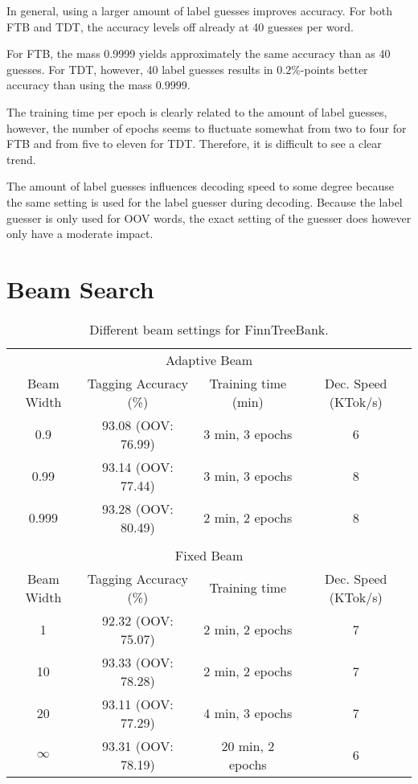 In general, using a larger amount of label guesses improves
accuracy. For both FTB and TDT, the accuracy levels off already at 40
guesses per word. 

For FTB, the mass 0.9999 yields approximately the same accuracy than
as 40 guesses. For TDT, however, 40 label guesses results in
$0.2\%$-points better accuracy than using the mass $0.9999$.

The training time per epoch is clearly related to the amount of label
guesses, however, the number of epochs seems to fluctuate somewhat
from two to four for FTB and from five to eleven for TDT. Therefore,
it is difficult to see a clear trend.

The amount of label guesses influences decoding speed to some degree
because the same setting is used for the label guesser during
decoding. Because the label guesser is only used for OOV words, the
exact setting of the guesser does however only have a moderate impact.

\section{Beam Search}

\begin{table}[htb!]
\begin{center}
\begin{tabular}{cccc}
\multicolumn{4}{c}{Adaptive Beam}\\
Beam Width & Tagging Accuracy (\%) & Training time (min) & Dec. Speed (KTok/s)\\
\hline
0.9        & 93.08 (OOV: 76.99)           & 3 min, 3 epochs & 6           \\
0.99       & 93.14 (OOV: 77.44)           & 3 min, 3 epochs & 8            \\
0.999      & 93.28 (OOV: 80.49)           & 2 min, 2 epochs & 8            \\
           &                  &               &               \\
\multicolumn{4}{c}{Fixed Beam}\\
Beam Width & Tagging Accuracy (\%) & Training time & Dec. Speed (KTok/s) \\
\hline
1        & 92.32 (OOV: 75.07)            & 2 min, 2 epochs & 7          \\
10       & 93.33 (OOV: 78.28)           & 2 min, 2 epochs &  7            \\
20       & 93.11 (OOV: 77.29)           & 4 min, 3 epochs &  7             \\
$\infty$ & 93.31 (OOV: 78.19)           & 20 min, 2 epochs            & 6            \\
\end{tabular}
\caption{Different beam settings for FinnTreeBank.}
\end{center}
\end{table}

